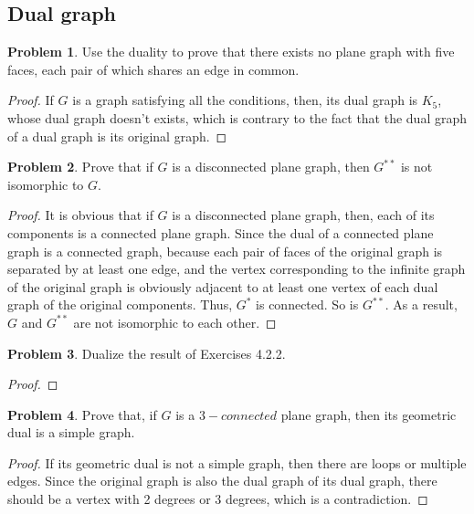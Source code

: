 \documentclass[a4paper,11pt]{article}%
\theoremstyle{remark}
\theoremstyle{definition}
\newtheorem{problem}{Problem}[subsection]
\begin{document}
\subsection{Dual graph}
\begin{problem}
    Use the duality to prove that there exists no plane graph with five faces, each pair of which shares  an edge in common.
    \begin{proof}
        If $G$ is a graph satisfying all the conditions, then, its dual graph is $K_5$, whose dual graph doesn't exists, which 
        is contrary to the fact that the dual graph of a dual graph is its original graph.
    \end{proof}
\end{problem}
\begin{problem}
    Prove that if $G$ is a disconnected plane graph, then $G^{**}$ is not isomorphic to $G$.
    \begin{proof}
        It is obvious that if $G$ is a disconnected plane graph, then, each of its components is a connected plane graph.
        Since the dual of a connected plane graph is a connected graph, because each pair of faces of the original graph is separated by at least one edge,
        and the vertex corresponding to the infinite graph of the original graph is obviously adjacent to at least one vertex of each 
        dual graph of the original components. Thus, $G^*$ is connected. So is $G^{**}$. As a result, $G$ and $G^{**}$ are not 
        isomorphic to each other.
    \end{proof}
\end{problem}
\begin{problem}
    Dualize the result of Exercises 4.2.2.
    \begin{proof}
    \end{proof}
\end{problem}
\begin{problem}
    Prove that, if $G$ is a $3-connected $ plane graph, then its geometric dual is a simple graph.
    \begin{proof}
        If its geometric dual is not a simple graph, then there are loops or multiple edges.
        Since the original graph is also the dual graph of its dual graph, there should be a vertex with 2 degrees or 3 degrees,
        which is a contradiction.
    \end{proof}
\end{problem}
\end{document}
